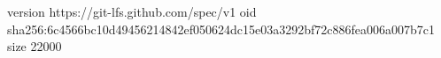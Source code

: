 version https://git-lfs.github.com/spec/v1
oid sha256:6c4566bc10d49456214842ef050624dc15e03a3292bf72c886fea006a007b7c1
size 22000
